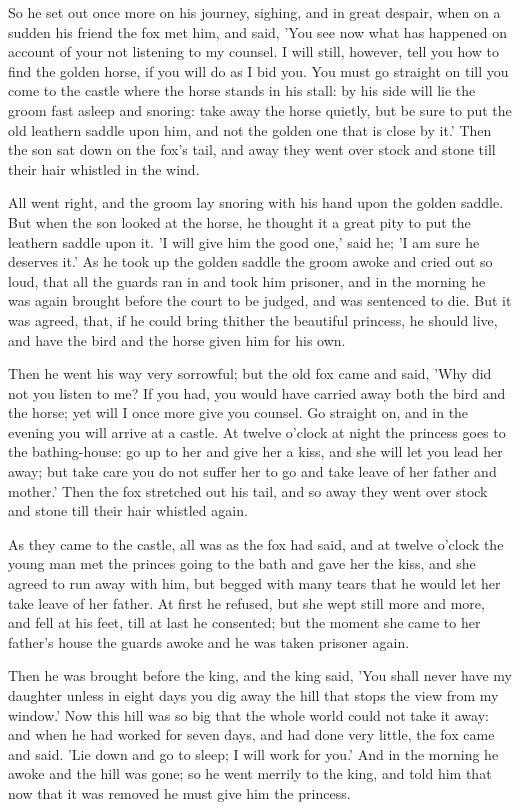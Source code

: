 \documentclass[12pt]{book}
\begin{document}
So he set out once more on his journey, sighing, and in great despair,
when on a sudden his friend the fox met him, and said, 'You see now
what has happened on account of your not listening to my counsel. I
will still, however, tell you how to find the golden horse, if you
will do as I bid you. You must go straight on till you come to the
castle where the horse stands in his stall: by his side will lie the
groom fast asleep and snoring: take away the horse quietly, but be
sure to put the old leathern saddle upon him, and not the golden one
that is close by it.' Then the son sat down on the fox's tail, and
away they went over stock and stone till their hair whistled in the
wind.

All went right, and the groom lay snoring with his hand upon the
golden saddle. But when the son looked at the horse, he thought it a
great pity to put the leathern saddle upon it. 'I will give him the
good one,' said he; 'I am sure he deserves it.' As he took up the
golden saddle the groom awoke and cried out so loud, that all the
guards ran in and took him prisoner, and in the morning he was again
brought before the court to be judged, and was sentenced to die. But
it was agreed, that, if he could bring thither the beautiful princess,
he should live, and have the bird and the horse given him for his own.

Then he went his way very sorrowful; but the old fox came and said,
'Why did not you listen to me? If you had, you would have carried away
both the bird and the horse; yet will I once more give you counsel. Go
straight on, and in the evening you will arrive at a castle. At twelve
o'clock at night the princess goes to the bathing-house: go up to her
and give her a kiss, and she will let you lead her away; but take care
you do not suffer her to go and take leave of her father and mother.'
Then the fox stretched out his tail, and so away they went over stock
and stone till their hair whistled again.

As they came to the castle, all was as the fox had said, and at twelve
o'clock the young man met the princes going to the bath and gave her
the kiss, and she agreed to run away with him, but begged with many
tears that he would let her take leave of her father. At first he
refused, but she wept still more and more, and fell at his feet, till
at last he consented; but the moment she came to her father's house
the guards awoke and he was taken prisoner again.

Then he was brought before the king, and the king said, 'You shall
never have my daughter unless in eight days you dig away the hill that
stops the view from my window.' Now this hill was so big that the
whole world could not take it away: and when he had worked for seven
days, and had done very little, the fox came and said. 'Lie down and
go to sleep; I will work for you.' And in the morning he awoke and the
hill was gone; so he went merrily to the king, and told him that now
that it was removed he must give him the princess.
\end{document}
